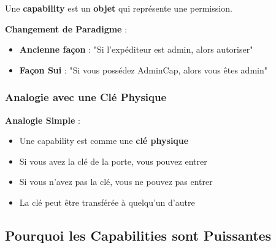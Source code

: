 \documentclass[11pt]{article}
\begin{document}
Une \textbf{capability} est un \textbf{objet} qui représente une permission.

\begin{explainBox}
\textbf{Changement de Paradigme} :
\begin{itemize}
  \item \textbf{Ancienne façon} : "Si l'expéditeur est admin, alors autoriser"
  \item \textbf{Façon Sui} : "Si vous possédez AdminCap, alors vous êtes admin"
\end{itemize}
\end{explainBox}

\subsubsection{Analogie avec une Clé Physique}

\begin{exampleBox}
\textbf{Analogie Simple} :
\begin{itemize}
  \item Une capability est comme une \textbf{clé physique}
  \item Si vous avez la clé de la porte, vous pouvez entrer
  \item Si vous n'avez pas la clé, vous ne pouvez pas entrer
  \item La clé peut être transférée à quelqu'un d'autre
\end{itemize}
\end{exampleBox}

\subsection{Pourquoi les Capabilities sont Puissantes}
\end{document}
